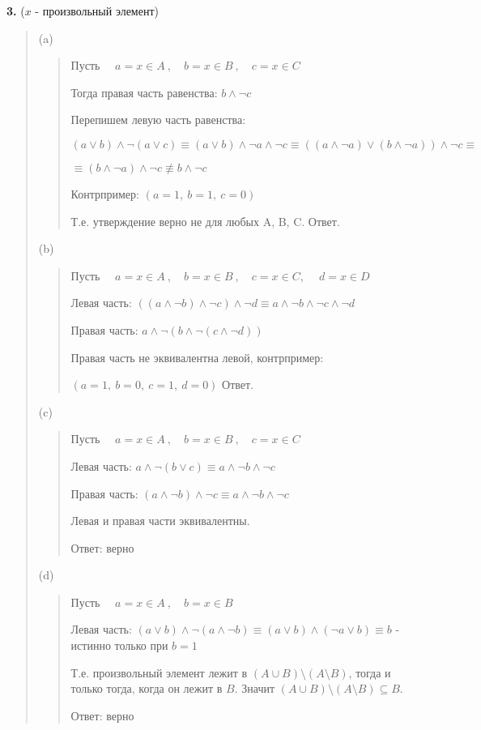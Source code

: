 \documentclass{article}
\begin{document}
\textsf{\textbf{3.}} ($x$ - произвольный элемент)
\begin{quote}
(a) 
\begin{quote}
    Пусть $\quad a = x \in A \ , \quad b = x \in B \ , \quad c = x \in C$ 

    Тогда правая часть равенства: $b \land \neg c$
    
    Перепишем левую часть равенства:

    \begin{center}
        $(a \lor b) \land \neg (a \lor c) \equiv (a \lor b) \land \neg a \land \neg c \equiv 
        ((a \land \neg a) \lor (b \land \neg a)) \land \neg c \equiv$
        
       $ 
        \equiv (b \land \neg a) \land \neg c \not \equiv b \land \neg c
        $
    \end{center}  

    Контрпример: $(a = 1, \ b = 1, \ c = 0)$
    
    Т.е. утверждение верно не для любых A, B, C. Ответ.

   
\end{quote}

(b) 
\begin{quote}
    Пусть $\quad a = x \in A \ , \quad b = x \in B \ , \quad c = x \in C , \ \quad d = x \in D$ 

    Левая часть:
    $((a \land \neg b) \land \neg c) \land \neg d  \equiv a \land \neg b \land \neg c \land \neg d$

    Правая часть:
    $a \land \neg (b \land \neg (c \land \neg d))$

    Правая часть не эквивалентна левой, контрпример:
    
    $(a = 1, \ b = 0, \  c = 1, \  d = 0)$ Ответ.

\end{quote}

(c) 
\begin{quote}
    Пусть $\quad a = x \in A \ , \quad b = x \in B \ , \quad c = x \in C $ 

    Левая часть:
    $a \land \neg (b \lor c) \equiv a \land \neg b \land \neg c$

    Правая часть:
    $(a \land \neg b) \land \neg c \equiv a \land \neg b \land \neg c$

    Левая и правая части эквивалентны.
    
    Ответ: верно
\end{quote}


(d) 
\begin{quote}
    Пусть $\quad a = x \in A \ , \quad b = x \in B $ 

    Левая часть: $(a \lor b) \land \neg (a \land \neg b) \equiv (a \lor b) \land (\neg a \lor b) \equiv b$ - 
    истинно только при $b = 1$

    Т.е. произвольный элемент лежит в $(A \cup B) \setminus (A \setminus B)$, тогда и только тогда, когда он лежит в $B$. Значит $(A \cup B) \setminus (A \setminus B) \subseteq B$. 
    
    Ответ: верно

\end{quote}
\end{quote}
\end{document}

